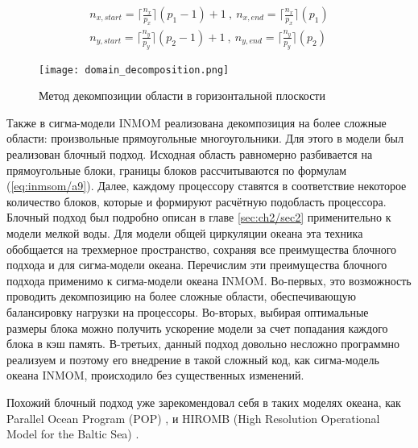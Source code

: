     \begin{equation} \label{eq:inmsom/a9} 
    \begin{array}{c} 
    \displaystyle{ n_{x, start} = \lceil \frac{n_x}{p_x} \rceil (p_1 - 1) + 1 ~,~ n_{x, end} =  \lceil \frac{n_x}{p_x} \rceil (p_1) } \\	
    
    \displaystyle{ n_{y, start} = \lceil \frac{n_y}{p_y} \rceil (p_2 - 1) + 1 ~,~ n_{y, end} =  \lceil \frac{n_y}{p_y} \rceil (p_2) }
    \end{array}
    \end{equation} 
    
	\begin{figure}[htb!]
	\center
	\texttt{[image: domain\_decomposition.png]}
	\caption{Метод декомпозиции области в горизонтальной плоскости}
	\label{fig:ddm3d}
	\end{figure}
        
    Также в сигма-модели INMOM реализована декомпозиция на более сложные области: произвольные прямоугольные многоугольники. 
    Для этого в модели был реализован блочный подход.
    Исходная область равномерно разбивается на прямоугольные блоки, границы блоков рассчитываются по формулам (\ref{eq:inmsom/a9}). 
    Далее, каждому процессору ставятся в соответствие некоторое количество блоков, которые и формируют расчётную подобласть процессора. 
    Блочный подход был подробно описан в главе \ref{sec:ch2/sec2} применительно к модели мелкой воды. Для модели общей циркуляции океана эта техника обобщается на трехмерное пространство, сохраняя все преимущества блочного подхода и для сигма-модели океана. 		
    Перечислим эти преимущества блочного подхода применимо к сигма-модели океана INMOM.
    Во-первых, это возможность проводить декомпозицию на более сложные области, обеспечивающую балансировку нагрузки на процессоры. 
    Во-вторых, выбирая оптимальные размеры блока можно получить ускорение модели за счет попадания каждого блока в кэш память.
    В-третьих, данный подход довольно несложно программно реализуем и поэтому его внедрение в такой сложный код, как сигма-модель океана INMOM, происходило 
    без существенных изменений.

    Похожий блочный подход уже зарекомендовал себя в таких моделях океана, как Parallel Ocean Program (POP) \cite{POP}, \cite{gmd-7-267-2014} и HIROMB (High Resolution Operational Model for the Baltic Sea) \cite{HIROMB}.

